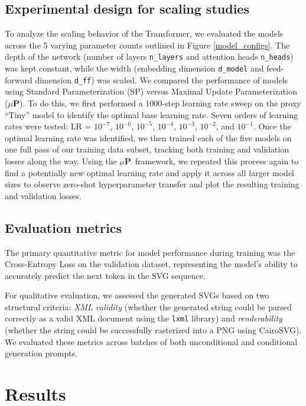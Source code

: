\documentclass[11pt]{article}
\newcommand{\mup}{$\mu$\textbf{P}}
\begin{document}
\subsection{Experimental design for scaling studies}

To analyze the scaling behavior of the Transformer, we evaluated the models across the
5 varying parameter counts outlined in Figure \ref{model_configs}. The depth of the network
(number of layers \verb|n_layers| and attention heads \verb|n_heads|) was kept constant,
while the width (embedding dimension \verb|d_model| and feed-forward dimension \verb|d_ff|) was scaled.
We compared the performance of models using Standard Parameterization (SP) versus Maximal
Update Parameterization (\mup). To do this, we first performed a 1000-step learning rate sweep on
the proxy ``Tiny'' model to identify the optimal base learning rate. Seven orders of learning rates were
tested: LR = $10^{-7}$, $10^{-6}$, $10^{-5}$, $10^{-4}$, $10^{-3}$, $10^{-2}$, and $10^{-1}$.
Once the optimal learning rate was identified, we then trained each of the five models on one full pass of
our training data subset, tracking both training and validation losses along the way.
Using the \mup~framework, we repeated this process again to find a potentially new optimal learning rate
and apply it across all larger model sizes to observe zero-shot hyperparameter transfer and
plot the resulting training and validation losses.

\subsection{Evaluation metrics}

The primary quantitative metric for model performance during training was the Cross-Entropy
Loss on the validation dataset, representing the model's ability to accurately predict the
next token in the SVG sequence.

For qualitative evaluation, we assessed the generated SVGs based on two structural criteria:
\textit{XML validity} (whether the generated string could be parsed correctly as a valid XML
document using the \verb|lxml| library) and \textit{renderability} (whether the string could
be successfully rasterized into a PNG using CairoSVG). We evaluated these metrics across
batches of both unconditional and conditional generation prompts.


\section{Results}
\end{document}
